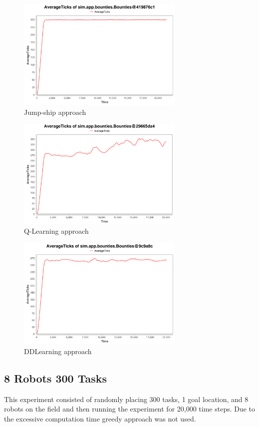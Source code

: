 \documentclass[twocolumn]{article}
\begin{document}
\begin{figure}[H]
\includegraphics[width=8cm]{greedy8and30}
\caption{Jump-ship approach}
\end{figure}
\begin{figure}[H]
\includegraphics[width=8cm]{qlearning8and30}
\caption{Q-Learning approach}
\end{figure}
\begin{figure}[H]
\includegraphics[width=8cm]{dd8and30}
\caption{DDLearning approach}
\end{figure}

\subsection{8 Robots 300 Tasks}
This experiment consisted of randomly placing 300 tasks, 1 goal location, and 8 robots on the field and then running the experiment for 20,000 time steps.  Due to the excessive computation time greedy approach was not used.
\end{document}

